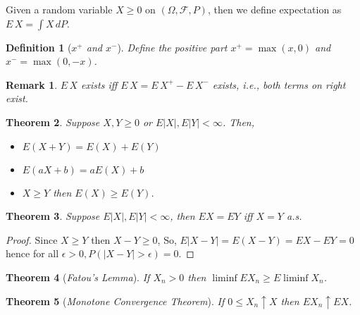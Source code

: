 \documentclass[10pt,a4paper]{article}
\newtheorem{theorem}{Theorem}[section]
\newtheorem{definition}[theorem]{Definition}
\numberwithin{equation}{subsection}
\newtheorem{remark}{Remark}
\begin{document}
Given a random variable $X \geq 0$ on $(\Omega, \mathcal{F}, P)$, then we define expectation
as $E\, X = \int X \, dP$. 

\begin{definition}[\emph{$x^+$ and $x^-$}]
	Define the positive part $x^+ = \max (x, 0) $ and $x^- = \max (0, -x)$. 
\end{definition}

\begin{remark}
	$E\, X$ exists iff $E\, X = E\, X^+ - E\, X^-$ exists, i.e., both terms on right
	exist. 
\end{remark}

\begin{theorem}
	Suppose $X, Y \geq 0$ or $E|X|, E|Y| < \infty$. Then, 
	\begin{itemize}
		\item $E(X+Y)= E(X)+E(Y)$
		\item $E(aX+b) = aE(X) + b$
		\item $X \geq Y$ then $E(X) \geq E(Y)$. 
	\end{itemize}
\end{theorem}

\begin{theorem}
	Suppose $E|X|, E|Y| < \infty$, then
	$EX = EY$ iff $X = Y$ a.s.
\end{theorem}

\begin{proof}
	Since $X \geq Y$ then $X - Y \geq 0$, So,
	$E|X-Y| = E(X-Y) = EX-EY=0$ hence for all 
	$\epsilon > 0, P(|X-Y| > \epsilon) = 0$. 
\end{proof}


\begin{theorem}[\emph{Fatou's Lemma}]
	If $X_n> 0$ then $\liminf EX_n \geq E \liminf X_n$.
\end{theorem}

\begin{theorem}[\emph{Monotone Convergence Theorem}]
	If $0 \leq X_n \uparrow X$ then $EX_n \uparrow EX$.
\end{theorem}
\end{document}
